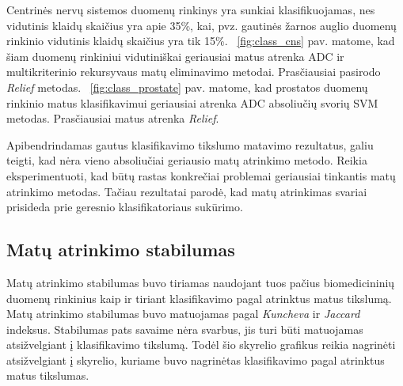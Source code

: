 Centrinės nervų sistemos duomenų rinkinys yra sunkiai klasifikuojamas, nes vidutinis klaidų skaičius yra apie 35\%, kai, pvz. gautinės žarnos auglio duomenų rinkinio vidutinis klaidų skaičius yra tik 15\%. ~\ref{fig:class_cns} pav. matome, kad šiam duomenų rinkiniui vidutiniškai geriausiai matus atrenka ADC ir multikriterinio rekursyvaus matų eliminavimo metodai. Prasčiausiai pasirodo \textit{Relief} metodas.
~\ref{fig:class_prostate} pav. matome, kad prostatos duomenų rinkinio matus klasifikavimui geriausiai atrenka ADC absoliučių svorių SVM metodas. Prasčiausiai matus atrenka \textit{Relief}.

Apibendrindamas gautus klasifikavimo tikslumo matavimo rezultatus, galiu teigti, kad nėra vieno absoliučiai geriausio matų atrinkimo metodo. Reikia eksperimentuoti, kad būtų rastas konkrečiai problemai geriausiai tinkantis matų atrinkimo metodas. Tačiau rezultatai parodė, kad matų atrinkimas svariai prisideda prie geresnio klasifikatoriaus sukūrimo.

\subsection{Matų atrinkimo stabilumas}

Matų atrinkimo stabilumas buvo tiriamas naudojant tuos pačius biomedicininių duomenų rinkinius kaip ir tiriant klasifikavimo pagal atrinktus matus tikslumą. Matų atrinkimo stabilumas buvo matuojamas pagal \textit{Kuncheva} ir \textit{Jaccard} indeksus. Stabilumas pats savaime nėra svarbus, jis turi būti matuojamas atsižvelgiant į klasifikavimo tikslumą. Todėl šio skyrelio grafikus reikia nagrinėti atsižvelgiant į skyrelio, kuriame buvo nagrinėtas klasifikavimo pagal atrinktus matus tikslumas.

